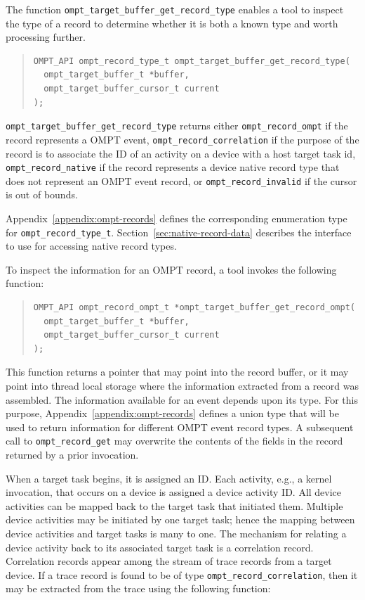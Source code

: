 \documentclass{article}
\begin{document}
The function \verb|ompt_target_buffer_get_record_type| enables a tool to inspect the type of a record to determine whether it is both a known type and worth processing further. 
\begin{quote}
\begin{verbatim}
OMPT_API ompt_record_type_t ompt_target_buffer_get_record_type(
  ompt_target_buffer_t *buffer, 
  ompt_target_buffer_cursor_t current
);
\end{verbatim}
\end{quote}
\sloppy
\verb|ompt_target_buffer_get_record_type| returns either \verb|ompt_record_ompt| if the record represents a OMPT event,  \verb|ompt_record_correlation| if the purpose of the record is to associate the ID of an activity on a device with a host target task id, \verb|ompt_record_native| if the record represents a device native record type that does not represent an OMPT event record, or \verb|ompt_record_invalid| if the cursor is out of bounds. 

Appendix~\ref{appendix:ompt-records} defines the corresponding enumeration type for \verb|ompt_record_type_t|. 
Section~\ref{sec:native-record-data} describes the interface to use for accessing native record types.
 

To inspect the information for an OMPT record, a tool invokes the following function:
\begin{quote}
\begin{verbatim}
OMPT_API ompt_record_ompt_t *ompt_target_buffer_get_record_ompt(
  ompt_target_buffer_t *buffer, 
  ompt_target_buffer_cursor_t current
);
\end{verbatim}
\end{quote}
This function returns a pointer that may point into the record buffer, or it may point into thread local storage where the information extracted from a record was assembled. The information available for an event depends upon its type. For this purpose, Appendix~\ref{appendix:ompt-records} defines a union type that will be used to return information for different OMPT event record types. A subsequent call to \verb|ompt_record_get| may overwrite the contents of the fields in the record returned by a prior invocation.

When a target task begins, it is assigned an ID. Each activity, e.g., a kernel invocation, that occurs on a device is assigned a device activity ID. All device activities can be mapped back to the target task that initiated them.  Multiple device activities may be initiated by one target task; hence the mapping between device activities and target tasks is many to one. The mechanism for relating a device activity back to its associated target task is a correlation record. Correlation records appear among the stream of trace records from a target device. If a trace record is found to be of type \verb|ompt_record_correlation|, then it may be extracted from the trace using the following function:
\end{document}
